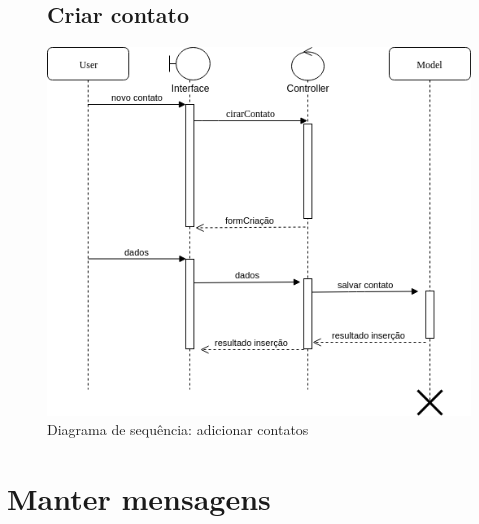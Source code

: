 \documentclass[
	12pt,				%
	openright,			%
	twoside,			%
	a4paper,			%
	english,			%
	french,				%
	spanish,			%
	brazil				%
]{abntex2}
\begin{document}
%
\begin{figure}
	\subsection{Criar contato}
	\label{figure_diagrama_sequencia_criar_contato}
	\caption{Diagrama de sequência: adicionar contatos}
	\includegraphics[scale=0.6]{SequenceContatos/CriarContatoSequence.png}
	\hfill
\end{figure}

\section{Manter mensagens}
\end{document}
